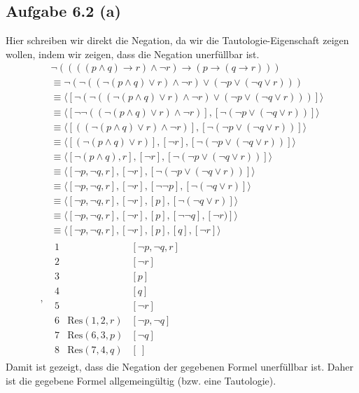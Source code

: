 \documentclass[12pt,a4paper]{article}
\newcommand{\Res}{\text{Res}}
\begin{document}
\subsection*{Aufgabe 6.2 (a)}
Hier schreiben wir direkt die Negation, da wir die Tautologie-Eigenschaft zeigen wollen, indem wir zeigen, dass die Negation unerfüllbar ist.
\begin{align*}
&\neg((((p\wedge q)\to r)\wedge\neg r)\to(p\to(q\to r)))\\
&\equiv
\neg(\neg((\neg(p\wedge q)\vee r)\wedge\neg r)\vee(\neg p\vee(\neg q\vee r)))\\
&\equiv
\langle[\neg(\neg((\neg(p\wedge q)\vee r)\wedge\neg r)\vee(\neg p\vee(\neg q\vee r)))]\rangle\\
&\equiv
\langle[\neg\neg((\neg(p\wedge q)\vee r)\wedge\neg r)],[\neg(\neg p\vee(\neg q\vee r))]\rangle\\
&\equiv
\langle[((\neg(p\wedge q)\vee r)\wedge\neg r)],[\neg(\neg p\vee(\neg q\vee r))]\rangle\\
&\equiv
\langle[(\neg(p\wedge q)\vee r)],[\neg r],[\neg(\neg p\vee(\neg q\vee r))]\rangle\\
&\equiv
\langle[\neg(p\wedge q), r],[\neg r],[\neg(\neg p\vee(\neg q\vee r))]\rangle\\
&\equiv
\langle[\neg p,\neg q, r],[\neg r],[\neg(\neg p\vee(\neg q\vee r))]\rangle\\
&\equiv
\langle[\neg p,\neg q, r],[\neg r],[\neg\neg p],[\neg(\neg q\vee r)]\rangle\\
&\equiv
\langle[\neg p,\neg q, r],[\neg r],[p],[\neg(\neg q\vee r)]\rangle\\
&\equiv
\langle[\neg p,\neg q, r],[\neg r],[p],[\neg\neg q],[\neg r)]\rangle\\
&\equiv
\langle[\neg p,\neg q, r],[\neg r],[p],[q],[\neg r]\rangle\\,
&\begin{array}{rll}
1 &&[\neg p,\neg q,r]\\
2 &&[\neg r]\\
3 &&[p]\\
4 &&[q]\\
5 &&[\neg r]\\
6 & \Res(1,2,r) & [\neg p,\neg q]\\
7 & \Res(6,3,p) & [\neg q]\\
8 & \Res(7,4,q) & [~]
\end{array}
\end{align*}
Damit ist gezeigt, dass die Negation der gegebenen Formel unerfüllbar ist. Daher ist die gegebene Formel allgemeingültig (bzw. eine Tautologie).
\end{document}
